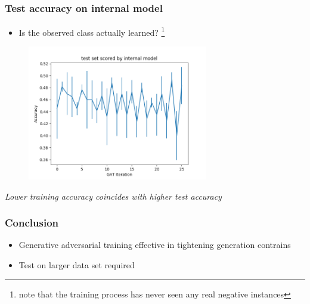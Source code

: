 \documentclass{beamer}
\begin{document}
\begin{frame}
    \frametitle{Test accuracy on internal model}
    \begin{itemize}
        \item Is the observed class actually learned?
            \footnote{note that the training process has never seen any real
            negative instances}
    \end{itemize}

   \begin{figure}[ht]
        \centering
        \includegraphics[width=0.70\textwidth]{images/eval3.png}
    \end{figure}
    \small{\em  Lower training accuracy coincides with higher test accuracy}
\end{frame}



\begin{frame}
    \frametitle{Conclusion}
    \begin{itemize}
        \item  Generative adversarial training effective in tightening 
            generation contrains
        \item Test on larger data set required
    \end{itemize}

\end{frame}
\end{document}
